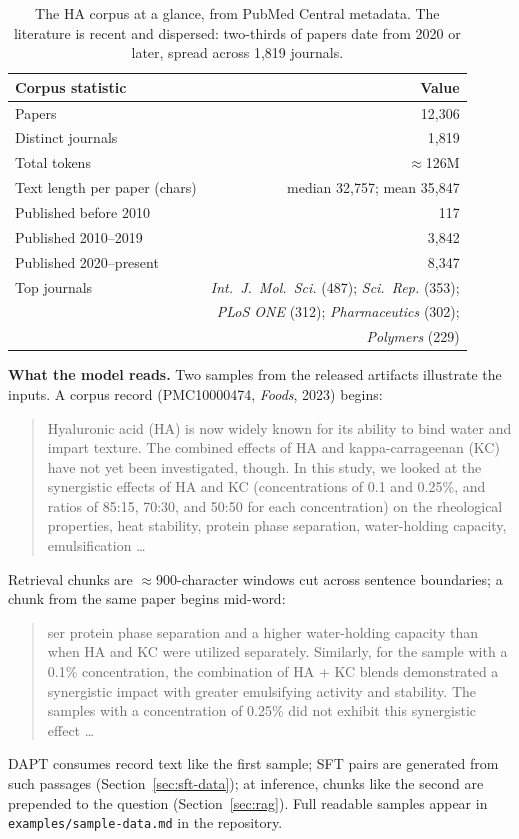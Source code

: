 \documentclass[11pt]{article}
\begin{document}
\begin{table}[t]
\centering
\begin{tabular}{lr}
\toprule
Corpus statistic & Value \\
\midrule
Papers & 12,306 \\
Distinct journals & 1,819 \\
Total tokens & $\approx$126M \\
Text length per paper (chars) & median 32,757; mean 35,847 \\
\midrule
Published before 2010 & 117 \\
Published 2010--2019 & 3,842 \\
Published 2020--present & 8,347 \\
\midrule
Top journals & \emph{Int.\ J.\ Mol.\ Sci.} (487); \emph{Sci.\ Rep.} (353); \\
 & \emph{PLoS ONE} (312); \emph{Pharmaceutics} (302); \\
 & \emph{Polymers} (229) \\
\bottomrule
\end{tabular}
\caption{The HA corpus at a glance, from PubMed Central metadata. The
literature is recent and dispersed: two-thirds of papers date from 2020
or later, spread across 1,819 journals.}
\label{tab:corpus}
\end{table}

\textbf{What the model reads.} Two samples from the released artifacts
illustrate the inputs. A corpus record (PMC10000474,
\emph{Foods}, 2023) begins:
\begin{quote}\small
Hyaluronic acid (HA) is now widely known for its ability to bind water
and impart texture. The combined effects of HA and kappa-carrageenan
(KC) have not yet been investigated, though. In this study, we looked at
the synergistic effects of HA and KC (concentrations of 0.1 and 0.25\%,
and ratios of 85:15, 70:30, and 50:50 for each concentration) on the
rheological properties, heat stability, protein phase separation,
water-holding capacity, emulsification \ldots
\end{quote}
Retrieval chunks are $\approx$900-character windows cut across sentence
boundaries; a chunk from the same paper begins mid-word:
\begin{quote}\small
ser protein phase separation and a higher water-holding capacity than
when HA and KC were utilized separately. Similarly, for the sample with
a 0.1\% concentration, the combination of HA + KC blends demonstrated a
synergistic impact with greater emulsifying activity and stability. The
samples with a concentration of 0.25\% did not exhibit this synergistic
effect \ldots
\end{quote}
DAPT consumes record text like the first sample; SFT pairs are
generated from such passages (Section~\ref{sec:sft-data}); at
inference, chunks like the second are prepended to the question
(Section~\ref{sec:rag}). Full readable samples appear in
\texttt{examples/sample-data.md} in the repository.
\end{document}
